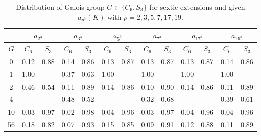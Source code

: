 \documentclass[letterpaper, 10pt]{article}
\newcommand{\1}{\mathds{1}}	%
\theoremstyle{definition}
\theoremstyle{remark}
\begin{document}
\begin{table}[H]
   \begin{center}
        \begin{tabular}{c|c|c|c|c|c|c|c|c|c|c|c|c}
            \toprule
            & \multicolumn{2}{c|}{$a_{2^3}$} & \multicolumn{2}{c|}{$a_{3^3}$} & \multicolumn{2}{c|}{$a_{5^3}$} & \multicolumn{2}{c|}{$a_{7^3}$} & \multicolumn{2}{c|}{$a_{17^3}$} & \multicolumn{2}{c}{$a_{19^3}$} \\
            \midrule
            $G$ & $C_{6}$ & $S_{3}$ & $C_{6}$ & $S_{3}$ & $C_{6}$ & $S_{3}$ & $C_{6}$ & $S_{3}$ & $C_{6}$ & $S_{3}$ & $C_{6}$ & $S_{3}$ \\
            \midrule
            0 & 0.12 & 0.88 & 0.14 & 0.86 & 0.13 & 0.87 & 0.13 & 0.87 & 0.13 & 0.87 & 0.14 & 0.86 \\
            1 & 1.00 & - & 0.37 & 0.63 & 1.00 & - & 1.00 & - & 1.00 & - & 1.00 & - \\
            2 & 0.46 & 0.54 & 0.11 & 0.89 & 0.14 & 0.86 & 0.10 & 0.90 & 0.14 & 0.86 & 0.11 & 0.89 \\
            4 & - & - & 0.48 & 0.52 & - & - & 0.32 & 0.68 & - & - & 0.39 & 0.61 \\
            10 & 0.03 & 0.97 & 0.02 & 0.98 & 0.04 & 0.96 & 0.03 & 0.97 & 0.04 & 0.96 & 0.04 & 0.96 \\
            56 & 0.18 & 0.82 & 0.07 & 0.93 & 0.15 & 0.85 & 0.09 & 0.91 & 0.12 & 0.88 & 0.11 & 0.89 \\
            \bottomrule
        \end{tabular}
        \caption{Distribution of Galois group $G \in \{C_6, S_3\}$ for sextic extensions and given $a_{p^3}(K)$ with $p = 2, 3, 5, 7, 17, 19$.}
        \label{tab:sextic_pcb_dist_G}
   \end{center}
\end{table}
\end{document}
